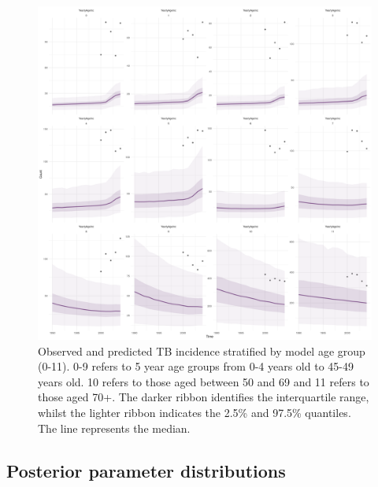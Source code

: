 \documentclass[11pt,twoside]{bristolthesis}
\begin{document}
  \begin{figure}
  
  {\centering \includegraphics[width=0.8\linewidth]{chapters/model-fitting/plots/overview-states-1990-age-1} 
  
  }
  
  \caption[Observed and predicted TB incidence stratified by model age group]{Observed and predicted TB incidence stratified by model age group (0-11). 0-9 refers to 5 year age groups from 0-4 years old to 45-49 years old. 10 refers to those aged between 50 and 69 and 11 refers to those aged 70+. The darker ribbon identifies the interquartile range, whilst the lighter ribbon indicates the 2.5\% and 97.5\% quantiles. The line represents the median.}\label{fig:09-age-strat-incidence}
  \end{figure}
  \hypertarget{posterior-parameter-distributions}{%
  \subsection{Posterior parameter distributions}\label{posterior-parameter-distributions}}
  
\end{document}
